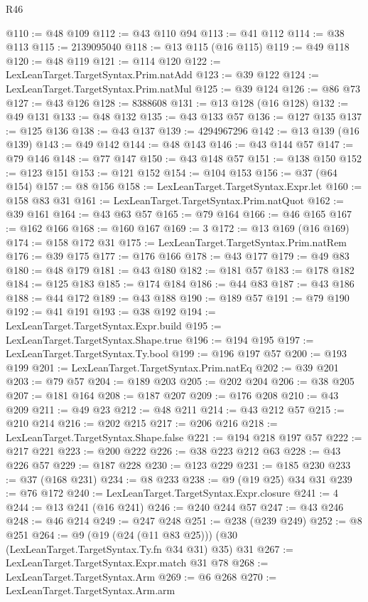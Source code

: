 \begin{lexlean}{R46}
\begin{coremodule}
@110 := @48 @109
@112 := @43 @110 @94
@113 := @41 @112
@114 := @38 @113
@115 := 2139095040
@118 := @13 @115 (@16 @115)
@119 := @49 @118
@120 := @48 @119
@121 := @114 @120
@122 := LexLeanTarget.TargetSyntax.Prim.natAdd
@123 := @39 @122
@124 := LexLeanTarget.TargetSyntax.Prim.natMul
@125 := @39 @124
@126 := @86 @73
@127 := @43 @126
@128 := 8388608
@131 := @13 @128 (@16 @128)
@132 := @49 @131
@133 := @48 @132
@135 := @43 @133 @57
@136 := @127 @135
@137 := @125 @136
@138 := @43 @137
@139 := 4294967296
@142 := @13 @139 (@16 @139)
@143 := @49 @142
@144 := @48 @143
@146 := @43 @144 @57
@147 := @79 @146
@148 := @77 @147
@150 := @43 @148 @57
@151 := @138 @150
@152 := @123 @151
@153 := @121 @152
@154 := @104 @153
@156 := @37 (@64 @154)
@157 := @8 @156
@158 := LexLeanTarget.TargetSyntax.Expr.let
@160 := @158 @83 @31
@161 := LexLeanTarget.TargetSyntax.Prim.natQuot
@162 := @39 @161
@164 := @43 @63 @57
@165 := @79 @164
@166 := @46 @165
@167 := @162 @166
@168 := @160 @167
@169 := 3
@172 := @13 @169 (@16 @169)
@174 := @158 @172 @31
@175 := LexLeanTarget.TargetSyntax.Prim.natRem
@176 := @39 @175
@177 := @176 @166
@178 := @43 @177
@179 := @49 @83
@180 := @48 @179
@181 := @43 @180
@182 := @181 @57
@183 := @178 @182
@184 := @125 @183
@185 := @174 @184
@186 := @44 @83
@187 := @43 @186
@188 := @44 @172
@189 := @43 @188
@190 := @189 @57
@191 := @79 @190
@192 := @41 @191
@193 := @38 @192
@194 := LexLeanTarget.TargetSyntax.Expr.build
@195 := LexLeanTarget.TargetSyntax.Shape.true
@196 := @194 @195
@197 := LexLeanTarget.TargetSyntax.Ty.bool
@199 := @196 @197 @57
@200 := @193 @199
@201 := LexLeanTarget.TargetSyntax.Prim.natEq
@202 := @39 @201
@203 := @79 @57
@204 := @189 @203
@205 := @202 @204
@206 := @38 @205
@207 := @181 @164
@208 := @187 @207
@209 := @176 @208
@210 := @43 @209
@211 := @49 @23
@212 := @48 @211
@214 := @43 @212 @57
@215 := @210 @214
@216 := @202 @215
@217 := @206 @216
@218 := LexLeanTarget.TargetSyntax.Shape.false
@221 := @194 @218 @197 @57
@222 := @217 @221
@223 := @200 @222
@226 := @38 @223 @212 @63
@228 := @43 @226 @57
@229 := @187 @228
@230 := @123 @229
@231 := @185 @230
@233 := @37 (@168 @231)
@234 := @8 @233
@238 := @9 (@19 @25) @34 @31
@239 := @76 @172
@240 := LexLeanTarget.TargetSyntax.Expr.closure
@241 := 4
@244 := @13 @241 (@16 @241)
@246 := @240 @244 @57
@247 := @43 @246
@248 := @46 @214
@249 := @247 @248
@251 := @238 (@239 @249)
@252 := @8 @251
@264 := @9 (@19 (@24 (@11 @83 @25))) (@30 (LexLeanTarget.TargetSyntax.Ty.fn @34 @31) @35) @31
@267 := LexLeanTarget.TargetSyntax.Expr.match @31 @78
@268 := LexLeanTarget.TargetSyntax.Arm
@269 := @6 @268
@270 := LexLeanTarget.TargetSyntax.Arm.arm

\end{coremodule}
\end{lexlean}
